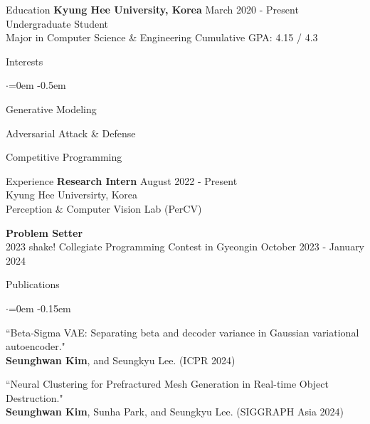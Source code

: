 \documentclass{resume}
\begin{document}
\begin{rSection}{Education}
  {\bf Kyung Hee University, Korea } \hfill {March 2020 - Present} \\
  { Undergraduate Student } \\
  { Major in Computer Science \& Engineering \hfill Cumulative GPA: 4.15 / 4.3 }
\end{rSection}

\begin{rSection}{Interests}
  \begin{list}{$\cdot$}{\leftmargin=0em}
    \itemsep -0.5em
    \item Generative Modeling
    \item Adversarial Attack \& Defense
    \item Competitive Programming
  \end{list}
\end{rSection}

\begin{rSection}{Experience}
  {\bf Research Intern } \hfill {August 2022 - Present} \\
  { Kyung Hee Universirty, Korea } \\
  { Perception \& Computer Vision Lab (PerCV) }

  {\bf Problem Setter } \\
  2023 shake! Collegiate Programming Contest in Gyeongin \hfill October 2023 - January 2024
\end{rSection}

\begin{rSection}{Publications}
  \begin{list}{$\cdot$}{\leftmargin=0em}
    \itemsep -0.15em
    \item ``Beta-Sigma VAE: Separating beta and decoder variance in Gaussian variational autoencoder." \\ {\bf Seunghwan Kim}, and Seungkyu Lee. (ICPR 2024)
    \item ``Neural Clustering for Prefractured Mesh Generation in Real-time Object Destruction." \\ {\bf Seunghwan Kim}, Sunha Park, and Seungkyu Lee. (SIGGRAPH Asia 2024)
  \end{list}
\end{rSection}
\end{document}
